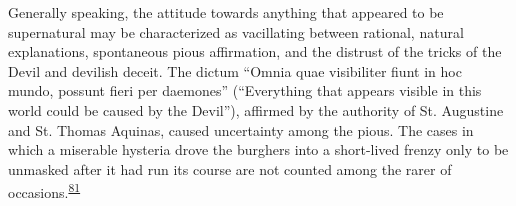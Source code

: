 Generally speaking, the attitude towards anything that appeared to be
supernatural may be characterized as vacillating between rational,
natural explanations, spontaneous pious affirmation, and the distrust of
the tricks of the Devil and devilish deceit. The dictum ``Omnia quae
visibiliter fiunt in hoc mundo, possunt fieri per daemones''
(``Everything that appears visible in this world could be caused by the
Devil''), affirmed by the authority of St. Augustine and St. Thomas
Aquinas, caused uncertainty among the pious. The cases in which a
miserable hysteria drove the burghers into a short-lived frenzy only to
be unmasked after it had run its course are not counted among the rarer
of
occasions.\textsuperscript{\protect\hypertarget{18_Chapter_Eleven__THE_FORMS_OF_THO.xhtmlux5cux23id_472}{\protect\hyperlink{23_NOTES.xhtmlux5cux23id_473}{81}}}
